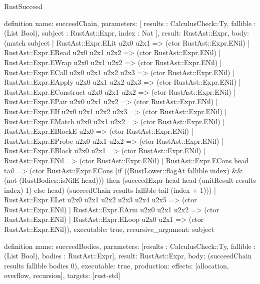 \begin{lexlean}{RustSucceed}
\begin{semanticmodule}
definition{
  name: succeedChain,
  parameters: [
    results : CalculusCheck::Ty,
    fallible : (List Bool),
    subject : RustAst::Expr,
    index : Nat
  ],
  result: RustAst::Expr,
  body: (match subject
    | RustAst::Expr.ELit u2x0 u2x1 => (ctor RustAst::Expr.ENil)
    | RustAst::Expr.ERead u2x0 u2x1 u2x2 => (ctor RustAst::Expr.ENil)
    | RustAst::Expr.EWrap u2x0 u2x1 u2x2 => (ctor RustAst::Expr.ENil)
    | RustAst::Expr.ECall u2x0 u2x1 u2x2 u2x3 => (ctor RustAst::Expr.ENil)
    | RustAst::Expr.EApply u2x0 u2x1 u2x2 u2x3 => (ctor RustAst::Expr.ENil)
    | RustAst::Expr.EConstruct u2x0 u2x1 u2x2 => (ctor RustAst::Expr.ENil)
    | RustAst::Expr.EPair u2x0 u2x1 u2x2 => (ctor RustAst::Expr.ENil)
    | RustAst::Expr.EIf u2x0 u2x1 u2x2 u2x3 => (ctor RustAst::Expr.ENil)
    | RustAst::Expr.EMatch u2x0 u2x1 u2x2 => (ctor RustAst::Expr.ENil)
    | RustAst::Expr.EBlockE u2x0 => (ctor RustAst::Expr.ENil)
    | RustAst::Expr.EProbe u2x0 u2x1 u2x2 => (ctor RustAst::Expr.ENil)
    | RustAst::Expr.EBlock u2x0 u2x1 => (ctor RustAst::Expr.ENil)
    | RustAst::Expr.ENil => (ctor RustAst::Expr.ENil)
    | RustAst::Expr.ECons head tail => (ctor RustAst::Expr.ECons (if ((RustLower::flagAt fallible index) && (not (RustBodies::isNilE head))) then (succeedExpr head head (unitResult results index) 1) else head) (succeedChain results fallible tail (index + 1)))
    | RustAst::Expr.ELet u2x0 u2x1 u2x2 u2x3 u2x4 u2x5 => (ctor RustAst::Expr.ENil)
    | RustAst::Expr.EArm u2x0 u2x1 u2x2 => (ctor RustAst::Expr.ENil)
    | RustAst::Expr.ELoop u2x0 u2x1 => (ctor RustAst::Expr.ENil)),
  executable: true,
  recursive_argument: subject
}

definition{
  name: succeedBodies,
  parameters: [results : CalculusCheck::Ty, fallible : (List Bool), bodies : RustAst::Expr],
  result: RustAst::Expr,
  body: (succeedChain results fallible bodies 0),
  executable: true,
  production: {effects: [allocation, overflow, recursion], targets: [rust-std]}
}
\end{semanticmodule}
\end{lexlean}
